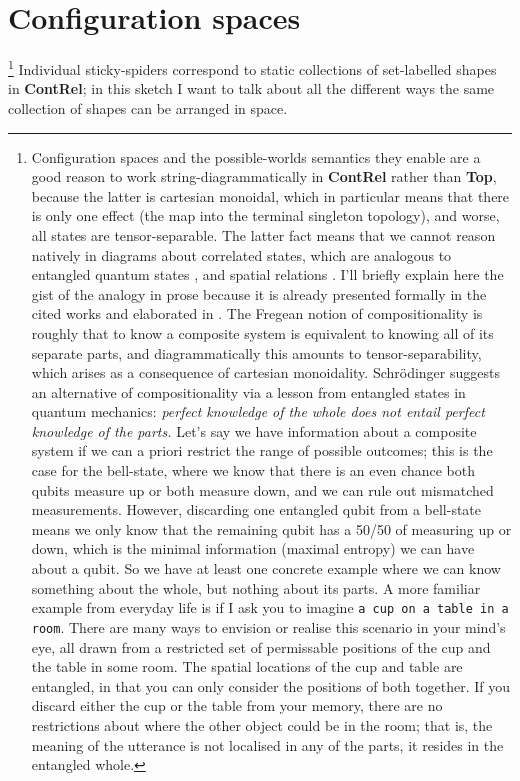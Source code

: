 \section{Configuration spaces}
\footnote{Configuration spaces and the possible-worlds semantics they enable are a good reason to work string-diagrammatically in \textbf{ContRel} rather than \textbf{Top}, because the latter is cartesian monoidal, which in particular means that there is only one effect (the map into the terminal singleton topology), and worse, all states are tensor-separable. The latter fact means that we cannot reason natively in diagrams about correlated states, which are analogous to entangled quantum states \citep{coecke_picturing_2017}, and spatial relations \citep{wang-mascianica_talking_2021}. I'll briefly explain here the gist of the analogy in prose because it is already presented formally in the cited works and elaborated in \citep{coecke_compositionality_2021}. The Fregean notion of compositionality is roughly that to know a composite system is equivalent to knowing all of its separate parts, and diagrammatically this amounts to tensor-separability, which arises as a consequence of cartesian monoidality. Schr\"{o}dinger suggests an alternative of compositionality via a lesson from entangled states in quantum mechanics: \emph{perfect knowledge of the whole does not entail perfect knowledge of the parts.} Let's say we have information about a composite system if we can a priori restrict the range of possible outcomes; this is the case for the bell-state, where we know that there is an even chance both qubits measure up or both measure down, and we can rule out mismatched measurements. However, discarding one entangled qubit from a bell-state means we only know that the remaining qubit has a 50/50 of measuring up or down, which is the minimal information (maximal entropy) we can have about a qubit. So we have at least one concrete example where we can know something about the whole, but nothing about its parts. A more familiar example from everyday life is if I ask you to imagine \texttt{a cup on a table in a room}. There are many ways to envision or realise this scenario in your mind's eye, all drawn from a restricted set of permissable positions of the cup and the table in some room. The spatial locations of the cup and table are entangled, in that you can only consider the positions of both together. If you discard either the cup or the table from your memory, there are no restrictions about where the other object could be in the room; that is, the meaning of the utterance is not localised in any of the parts, it resides in the entangled whole.}
Individual sticky-spiders correspond to static collections of set-labelled shapes in \textbf{ContRel}; in this sketch I want to talk about all the different ways the same collection of shapes can be arranged in space.

